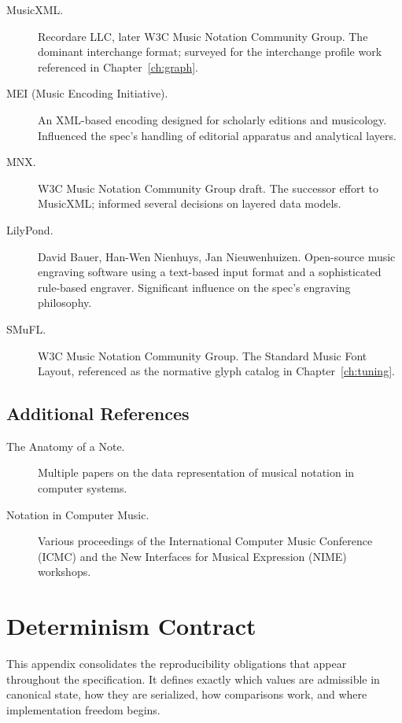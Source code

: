 \documentclass[11pt,letterpaper]{report}
\begin{document}
\begin{description}
  \item[MusicXML.] Recordare LLC, later W3C Music Notation Community
    Group. The dominant interchange format; surveyed for the
    interchange profile work referenced in
    Chapter~\ref{ch:graph}.
  \item[MEI (Music Encoding Initiative).] An XML-based encoding
    designed for scholarly editions and musicology. Influenced the
    spec's handling of editorial apparatus and analytical layers.
  \item[MNX.] W3C Music Notation Community Group draft. The
    successor effort to MusicXML; informed several decisions on
    layered data models.
  \item[LilyPond.] David Bauer, Han-Wen Nienhuys, Jan Nieuwenhuizen.
    Open-source music engraving software using a text-based input
    format and a sophisticated rule-based engraver. Significant
    influence on the spec's engraving philosophy.
  \item[SMuFL.] W3C Music Notation Community Group. The Standard
    Music Font Layout, referenced as the normative glyph catalog
    in Chapter~\ref{ch:tuning}.
\end{description}

\section*{Additional References}

\begin{description}
  \item[The Anatomy of a Note.] Multiple papers on the data
    representation of musical notation in computer systems.
  \item[Notation in Computer Music.] Various proceedings of the
    International Computer Music Conference (ICMC) and the New
    Interfaces for Musical Expression (NIME) workshops.
\end{description}

\chapter{Determinism Contract}
\label{app:determinism}

This appendix consolidates the reproducibility obligations that
appear throughout the specification. It defines exactly which
values are admissible in canonical state, how they are serialized,
how comparisons work, and where implementation freedom begins.
\end{document}
